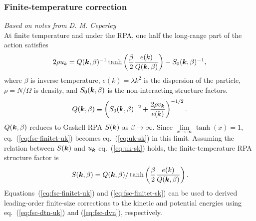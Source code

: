 \subsubsection{Finite-temperature correction}
\textit{Based on notes from D. M. Ceperley}\\
At finite temperature and under the RPA, one half the long-range part of the action satisfies
\begin{align} \label{eq:fsc-finitet-uk}
2\rho u_k = Q(\boldsymbol{k}, \beta)^{-1}\tanh\left(
\dfrac{\beta}{2}\dfrac{e(k)}{Q(\boldsymbol{k}, \beta)}
\right) - S_0(\boldsymbol{k},\beta)^{-1},
\end{align}
where $\beta$ is inverse temperature, $e(k)=\lambda k^2$ is the dispersion of the particle, $\rho=N/\Omega$ is density, and $S_0(\boldsymbol{k}, \beta)$ is the non-interacting structure factors.
\begin{align}
Q(\boldsymbol{k}, \beta) \equiv \left(S_0(\boldsymbol{k}, \beta)^{-2}+\dfrac{2\rho v_{\boldsymbol{k}}}{e(k)}\right)^{-1/2}.
\end{align}
$Q(\boldsymbol{k}, \beta)$ reduces to Gaskell RPA $S(\boldsymbol{k})$ as $\beta\rightarrow\infty$. Since $\lim\limits_{x\rightarrow\infty}\tanh(x)=1$, eq.~(\ref{eq:fsc-finitet-uk}) becomes eq.~(\ref{eq:uk-sk}) in this limit. Assuming the relation between $S(\boldsymbol{k})$ and $u_{\boldsymbol{k}}$ eq.~(\ref{eq:uk-sk}) holds, the finite-temperature RPA structure factor is
\begin{align} \label{eq:fsc-finitet-sk}
S(\boldsymbol{k},\beta) = Q(\boldsymbol{k},\beta)/\tanh\left(
\dfrac{\beta}{2}\dfrac{e(k)}{Q(\boldsymbol{k}, \beta)}
\right).
\end{align}
Equations~(\ref{eq:fsc-finitet-uk}) and (\ref{eq:fsc-finitet-sk}) can be used to derived leading-order finite-size corrections to the kinetic and potential energies using eq.~(\ref{eq:fsc-dtn-uk}) and (\ref{eq:fsc-dvn}), respectively.

